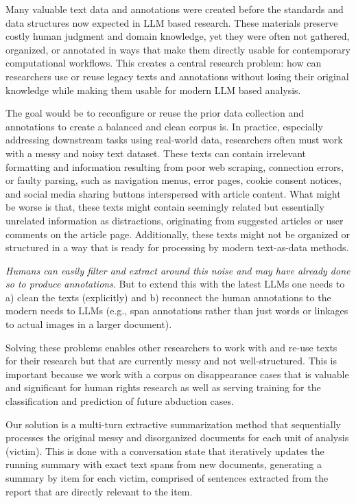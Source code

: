 \documentclass{article}
\begin{document}

Many valuable text data and annotations were created before the standards and data structures now expected in LLM based research. These materials preserve costly human judgment and domain knowledge, yet they were often not gathered, organized, or annotated in ways that make them directly usable for contemporary computational workflows. This creates a central research problem: how can researchers use or reuse legacy texts and annotations without losing their original knowledge while making them usable for modern LLM based analysis.

The goal would be to reconfigure or reuse the prior data collection and annotations to create a balanced and clean corpus is. In practice, especially addressing downstream tasks using real-world data, researchers often must work with a messy and noisy text dataset. These texts can contain irrelevant formatting and information resulting from poor web scraping, connection errors, or faulty parsing, such as navigation menus, error pages, cookie consent notices, and social media sharing buttons interspersed with article content. What might be worse is that, these texts might contain seemingly related but essentially unrelated information as distractions, originating from suggested articles or user comments on the article page. Additionally, these texts might not be organized or structured in a way that is ready for processing by modern text-as-data methods.

\emph{Humans can easily filter and extract around this noise and may have already done so to produce annotations}.  But to extend this with the latest LLMs one needs to a) clean the texts (explicitly) and b) reconnect the human annotations to the modern needs to LLMs (e.g., span annotations rather than just words or linkages to actual images in a larger document). 

Solving these problems enables other researchers to work with and re-use texts for their research but that are currently messy and not well-structured. This is important because we work with a corpus on disappearance cases that is valuable and significant for human rights research as well as serving training for the classification and prediction of future abduction cases.

Our solution is a multi-turn extractive summarization method that sequentially processes the original messy and disorganized documents for each unit of analysis (victim).  This is done with a conversation state that iteratively updates the running summary with exact text spans from new documents, generating a summary by item for each victim, comprised of sentences extracted from the report that are directly relevant to the item.
\end{document}
